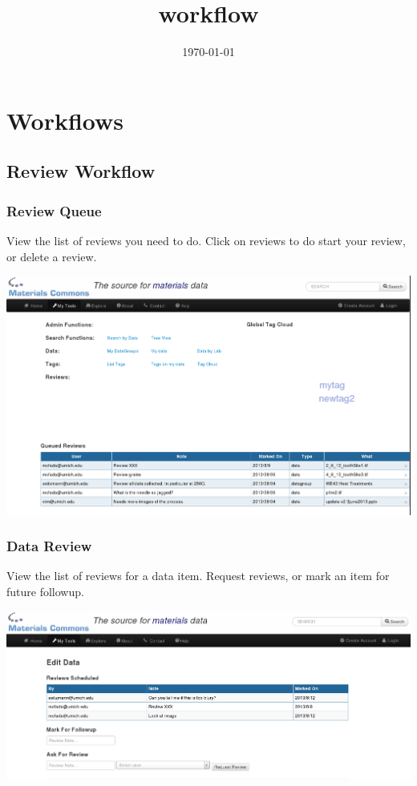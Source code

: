 \documentclass[11pt]{article}
\date{\today}
\title{workflow}
\begin{document}
\maketitle
\tableofcontents


\section{Workflows}
\label{sec-1}

\subsection{Review Workflow}
\label{sec-1-1}

\subsubsection{Review Queue}
\label{sec-1-1-1}
View the list of reviews you need to do. Click on reviews to do start your review, or delete a review.

\includegraphics[width=.9\linewidth]{ReviewQueue.png}

\subsubsection{Data Review}
\label{sec-1-1-2}
View the list of reviews for a data item. Request reviews, or mark an item for future followup.

\includegraphics[width=.9\linewidth]{DataReview.png}
\end{document}
